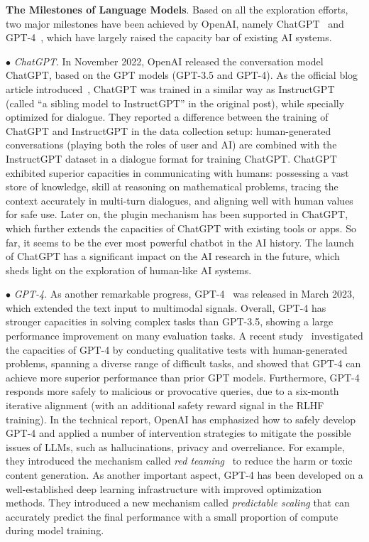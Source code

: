 \textbf{The Milestones of Language Models}. Based on all the exploration efforts, two major milestones have been achieved by OpenAI, namely  ChatGPT~\cite{OpenAI-blog-2022-ChatGPT} and GPT-4~\cite{OpenAI-OpenAI-2023-GPT-4}, which have largely raised the capacity bar of existing AI systems. 

$\bullet$ \emph{ChatGPT}. In November 2022, OpenAI released the conversation model  ChatGPT, based on the GPT models (GPT-3.5 and GPT-4). As the official blog article introduced~\cite{OpenAI-blog-2022-ChatGPT}, ChatGPT was trained in a similar way as InstructGPT (called ``a sibling model to InstructGPT'' in the original post), while specially optimized for dialogue. They reported a difference between the training of ChatGPT and InstructGPT in  the data collection setup: human-generated conversations (playing both the roles of user and AI) are combined with the InstructGPT dataset in a dialogue format for training ChatGPT. ChatGPT exhibited superior capacities in communicating with humans: possessing  a vast store of knowledge,  skill at reasoning on mathematical problems, tracing the context accurately in multi-turn dialogues, and aligning well with human values for safe use. Later on, the plugin mechanism has been supported in ChatGPT, which further  extends the capacities of ChatGPT with existing tools or apps. So far, it seems to be the ever most powerful chatbot in the AI history. The launch of ChatGPT has a significant impact on the AI research in the future, which sheds light on the exploration of  human-like AI systems. 

$\bullet$ \emph{GPT-4}. As another remarkable progress,  GPT-4~\cite{OpenAI-OpenAI-2023-GPT-4} was released in March 2023, which extended the text input to multimodal signals. Overall, GPT-4 has  stronger capacities  in solving complex tasks than GPT-3.5, showing a large performance improvement on many evaluation tasks. A recent study~\cite{Bubeck-arxiv-2023-Sparks}  investigated the capacities of GPT-4 by conducting qualitative tests with human-generated  problems, spanning a diverse range of difficult  tasks, and showed  that GPT-4 can achieve more superior performance than prior GPT models. Furthermore, GPT-4  responds more safely to  malicious or provocative queries, due to a six-month iterative alignment (with an additional  safety reward signal in the RLHF training). In the technical report, OpenAI has emphasized how to safely develop GPT-4 and applied  a number of  intervention strategies  to mitigate the possible issues of LLMs, such as hallucinations, privacy and overreliance. For example, they introduced the mechanism called \emph{red teaming}~\cite{Ganguli-arxiv-2022-Red}  to reduce the harm or toxic content generation. As another important aspect, GPT-4 has been developed on a well-established deep learning infrastructure with improved optimization methods. They  introduced a new mechanism called \emph{predictable scaling} that can  accurately predict the final performance with a small proportion of compute during model training. 

